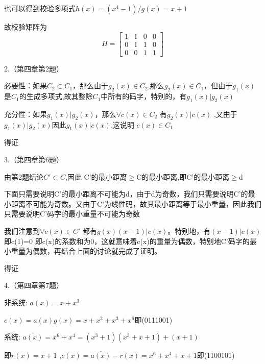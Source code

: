 \documentclass{ctexart}
\begin{document}
    也可以得到校验多项式$h(x)=(x^4-1)/g(x)=x+1$
    
    故校验矩阵为$$H=
    \begin{bmatrix}
    1 & 1 & 0 & 0\\
    0 & 1 & 1 & 0\\
    0 & 0 & 1 & 1
    \end{bmatrix} 
    $$

	
	
	2.（第四章第2题）
	
	必要性：如果$C_{2} \subset C_{1}$，那么由于$g_{2}(x)\in C_{2}$,那么$g_{2}(x)\in C_{1}$，但由于$g_{1}(x)$是$C_{1}$的生成多项式,故其整除$C_{1}$中所有的码字，特别的，有$g_{1}(x)|g_{2}(x)$
	
	充分性：如果$g_{1}(x)|g_{2}(x)$，那么$\forall c(x) \in C_{2}$ 有$g_{2}(x)|c(x)$ ,又由于$g_{1}(x)|g_{2}(x)$因此$g_{1}(x)|c(x)$,这说明
	$c(x) \in C_{1}$
	
	得证
     
	3.（第四章第6题）
	
	由第2题结论$C' \subset C$,因此 C'的最小距离$\geq$C的最小距离,即C'的最小距离$\geq$d
	
	下面只需要说明C'的最小距离不可能为d，由于d为奇数，我们只需要说明C'的最小距离不可能为奇数。又由于C'为线性码，故其最小距离等于最小重量，因此我们只需要说明C'码字的最小重量不可能为奇数
	
	我们注意到$\forall c(x) \in C'$ 都有$g(x)(x-1)|c(x)$。特别地，有$(x-1)|c(x)$即c(1)=0 即c(x)的系数和为0，这就意味着c(x)的重量为偶数，特别地C'码字的最小重量为偶数，再结合上面的讨论就完成了证明。
	
	得证
	
	
	
	4.（第四章第7题）
	
    非系统: $a(x)=x+x^3$
    
    $c(x)=a(x)g(x)=x+x^2+x^3+x^6$即(0111001)
    
    系统:
    $\overline{a(x)}=x^6+x^4=(x^3+1)(x^3+x+1)+(x+1)$
    
    即$r(x)=x+1$ ,$c(x)=\overline{a(x)}-r(x)=x^6+x^4+x+1$即(1100101)
\end{document}
